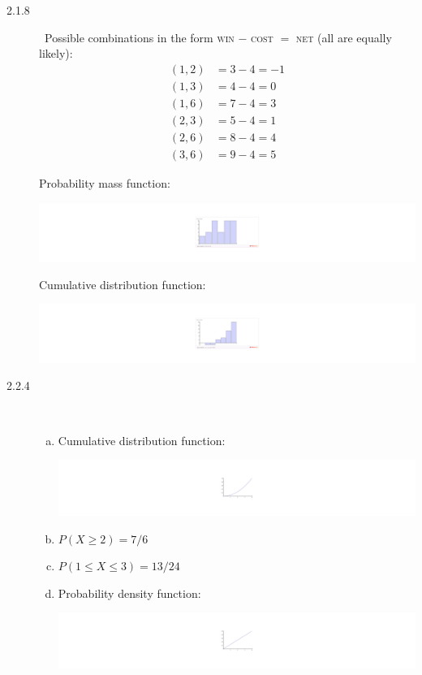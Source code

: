 \documentclass[letterpaper,10pt]{article}
\begin{document}
\begin{description}
\item[2.1.8] \ 
Possible combinations in the form \textsc{win} $-$ \textsc{cost} $=$ \textsc{net} (all are equally likely):
\begin{align*}
(1, 2) &= 3-4=-1 \\
(1, 3) &= 4-4=0 \\
(1,6) &= 7-4=3 \\
(2,3) &= 5-4 = 1 \\
(2,6) &= 8-4=4 \\
(3,6) &= 9-4=5
\end{align*}

Probability mass function:
\begin{center}
\includegraphics[scale=0.75]{module2d.pdf}
\end{center}

Cumulative distribution function:
\begin{center}
\includegraphics[scale=0.75]{module2e.pdf}
\end{center}

\item[2.2.4] \  
\begin{enumerate}[a)]
\item Cumulative distribution function:
\begin{center}
\includegraphics[scale=0.75]{module2f.pdf}
\end{center}
\item $P(X\geq 2) = 7/6$
\item $P(1 \leq X \leq 3) = 13/24$
\item Probability density function:
\begin{center}
\includegraphics[scale=0.75]{module2g.pdf}
\end{center}
\end{enumerate}


\end{description}
\end{document}
